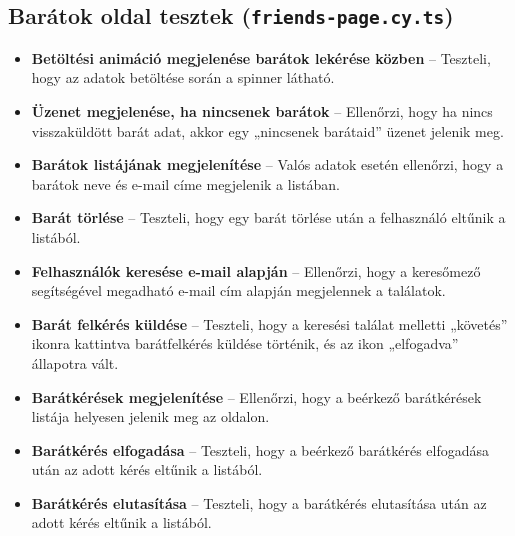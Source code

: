 \documentclass[12pt]{report}
\begin{document}
\subsection{Barátok oldal tesztek (\texttt{friends-page.cy.ts})}

\begin{itemize}
  \item \textbf{Betöltési animáció megjelenése barátok lekérése közben} – Teszteli, hogy az adatok betöltése során a spinner látható.
  \item \textbf{Üzenet megjelenése, ha nincsenek barátok} – Ellenőrzi, hogy ha nincs visszaküldött barát adat, akkor egy „nincsenek barátaid” üzenet jelenik meg.
  \item \textbf{Barátok listájának megjelenítése} – Valós adatok esetén ellenőrzi, hogy a barátok neve és e-mail címe megjelenik a listában.
  \item \textbf{Barát törlése} – Teszteli, hogy egy barát törlése után a felhasználó eltűnik a listából.
  \item \textbf{Felhasználók keresése e-mail alapján} – Ellenőrzi, hogy a keresőmező segítségével megadható e-mail cím alapján megjelennek a találatok.
  \item \textbf{Barát felkérés küldése} – Teszteli, hogy a keresési találat melletti „követés” ikonra kattintva barátfelkérés küldése történik, és az ikon „elfogadva” állapotra vált.
  \item \textbf{Barátkérések megjelenítése} – Ellenőrzi, hogy a beérkező barátkérések listája helyesen jelenik meg az oldalon.
  \item \textbf{Barátkérés elfogadása} – Teszteli, hogy a beérkező barátkérés elfogadása után az adott kérés eltűnik a listából.
  \item \textbf{Barátkérés elutasítása} – Teszteli, hogy a barátkérés elutasítása után az adott kérés eltűnik a listából.
\end{itemize}
\end{document}
